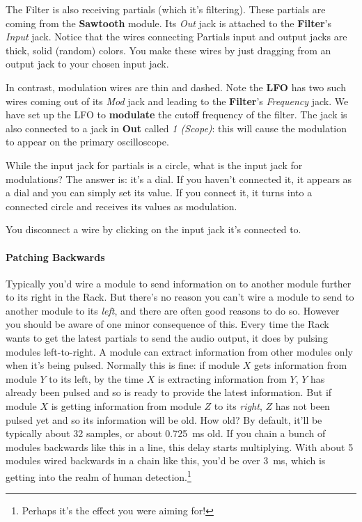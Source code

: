 \documentclass{article}
\begin{document}
The Filter is also receiving partials (which it's filtering).  These partials are coming from the {\bf Sawtooth} module.  Its {\it Out} jack is attached to the {\bf Filter}'s {\it Input} jack.  Notice that the wires connecting Partials input and output jacks are thick, solid (random) colors.  You make these wires by just dragging from an output jack to your chosen input jack.

In contrast, modulation wires are thin and dashed.  Note the {\bf LFO} has two such wires coming out of its {\it Mod} jack and leading to the {\bf Filter}'s {\it Frequency} jack.  We have set up the LFO to {\bf modulate} the cutoff frequency of the filter.
The jack is also connected to a jack in {\bf Out} called {\it 1 (Scope)}: this will cause the modulation to appear on the primary oscilloscope.  

While the input jack for partials is a circle, what is the input jack for modulations?  The answer is: it's a dial.  If you haven't connected it, it appears as a dial and you can simply set its value.  If you connect it, it turns into a connected circle and receives its values as modulation. 

You disconnect a wire by clicking on the input jack it's connected to.

\paragraph{Patching Backwards}  Typically you'd wire a module to send information on to another module further to its right in the Rack.  But there's no reason you can't wire a module to send to another module to its {\it left}, and there are often good reasons to do so.  However you should be aware of one minor consequence of this.  Every time the Rack wants to get the latest partials to send the audio output, it does by pulsing modules left-to-right.  A module can extract information from other modules only when it's being pulsed.  Normally this is fine: if module \(X\) gets information from module \(Y\) to its left, by the time \(X\) is extracting information from \(Y\), \(Y\) has already been pulsed and so is ready to provide the latest information.  But if module \(X\) is getting information from module \(Z\) to its {\it right}, \(Z\) has not been pulsed yet and so its information will be old.  How old?  By default, it'll be typically about 32 samples, or about 0.725~ms old.  If you chain a bunch of modules backwards like this in a line, this delay starts multiplying.   With about 5 modules wired backwards in a chain like this, you'd be over 3~ms, which is getting into the realm of human detection.\footnote{Perhaps it's the effect you were aiming for!} 
\end{document}
